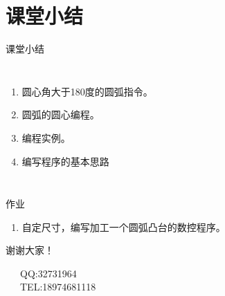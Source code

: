 \documentclass[UTF8,zihao=-4]{ctexbeamer}
\begin{document}
\section*{课堂小结}
\begin{frame}{课堂小结}
    \begin{columns}
\begin{enumerate}
\item 圆心角大于180度的圆弧指令。
\item 圆弧的圆心编程。
\item 编程实例。
\item 编写程序的基本思路
\end{enumerate}
    \end{columns}
\end{frame}

\begin{frame}{作业}
\begin{enumerate}
    \item 自定尺寸，编写加工一个圆弧凸台的数控程序。
\end{enumerate}
\end{frame}

\begin{frame}[plain]
\vfill

\centering \huge 谢谢大家！

\vfill

\flushleft \footnotesize   
~~~QQ:32731964\\
~~~TEL:18974681118\\

\end{frame}
\end{document}
